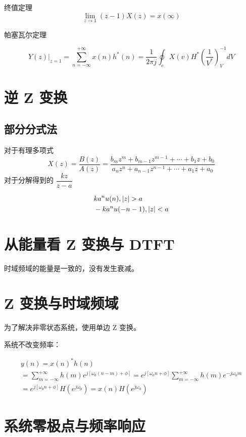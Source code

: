 \documentclass[cn,11pt,chinese,black,simple]{elegantbook}
\begin{document}
终值定理 \[\lim_{z\rightarrow 1}(z-1)X(z) = x(\infty)\]

帕塞瓦尔定理

\[
\left.Y(z)\right|_{z=1}=\sum_{n=-\infty}^{+\infty} x(n) h^{*}(n)=\frac{1}{2 \pi j} \oint_{c} X(v) H^{*}\left(\frac{1}{V^{*}}\right)_{V}^{-1} d V
\]

\section{逆 Z 变换}

\subsection{部分分式法}

对于有理多项式 \[
    X(z)=\dfrac{B(z)}{A(z)}=\dfrac{b_{m} z^{m}+b_{m-1} z^{m-1}+\cdots+b_{1} z+b_{0}}{a_{n} z^{n}+a_{n-1} z^{n-1}+\cdots+a_{1} z+a_{0}}
\]
对于分解得到的 \(\dfrac{k z}{z-a}\)

\[
\begin{aligned}
    &k a^n u(n), \left| z \right| > a\\
    &-k a^n u(-n-1), \left| z \right| < a\\
\end{aligned}    
\]

\section{从能量看 Z 变换与 DTFT} 

时域频域的能量是一致的，没有发生衰减。


\section{Z 变换与时域频域}

为了解决非零状态系统，使用单边 Z 变换。

系统不改变频率：

\[
\begin{array}{l}
y(n)=x(n)^{*} h(n) \\
=\sum_{m=-\infty}^{+\infty} h(m) e^{j\left[\omega_{0}(n-m)+\phi\right]}=e^{j\left[\omega_{0} n+\phi\right]} \sum_{m=-\infty}^{+\infty} h(m) e^{-j \omega_{0} m} \\
=e^{j\left[\omega_{0} n+\phi\right]} H\left(e^{j \omega_{0}}\right)=x(n) H\left(e^{j \omega_{0}}\right)
\end{array}
\]

\section{系统零极点与频率响应}
\end{document}
